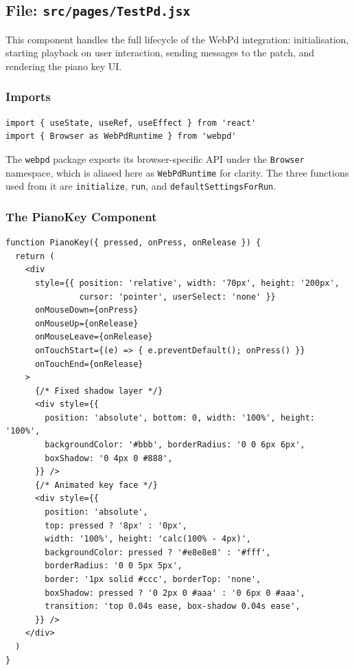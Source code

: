 \documentclass[12pt,a4paper]{article}
\begin{document}
\subsection{File: \texttt{src/pages/TestPd.jsx}}

This component handles the full lifecycle of the WebPd integration: initialisation, starting playback on user interaction, sending messages to the patch, and rendering the piano key UI.

\subsubsection{Imports}

\begin{lstlisting}[style=js, caption={Imports}]
import { useState, useRef, useEffect } from 'react'
import { Browser as WebPdRuntime } from 'webpd'
\end{lstlisting}

The \texttt{webpd} package exports its browser-specific API under the \texttt{Browser} namespace, which is aliased here as \texttt{WebPdRuntime} for clarity. The three functions used from it are \texttt{initialize}, \texttt{run}, and \texttt{defaultSettingsForRun}.

\subsubsection{The PianoKey Component}

\begin{lstlisting}[style=js, caption={PianoKey component}]
function PianoKey({ pressed, onPress, onRelease }) {
  return (
    <div
      style={{ position: 'relative', width: '70px', height: '200px',
               cursor: 'pointer', userSelect: 'none' }}
      onMouseDown={onPress}
      onMouseUp={onRelease}
      onMouseLeave={onRelease}
      onTouchStart={(e) => { e.preventDefault(); onPress() }}
      onTouchEnd={onRelease}
    >
      {/* Fixed shadow layer */}
      <div style={{
        position: 'absolute', bottom: 0, width: '100%', height: '100%',
        backgroundColor: '#bbb', borderRadius: '0 0 6px 6px',
        boxShadow: '0 4px 0 #888',
      }} />
      {/* Animated key face */}
      <div style={{
        position: 'absolute',
        top: pressed ? '8px' : '0px',
        width: '100%', height: 'calc(100% - 4px)',
        backgroundColor: pressed ? '#e8e8e8' : '#fff',
        borderRadius: '0 0 5px 5px',
        border: '1px solid #ccc', borderTop: 'none',
        boxShadow: pressed ? '0 2px 0 #aaa' : '0 6px 0 #aaa',
        transition: 'top 0.04s ease, box-shadow 0.04s ease',
      }} />
    </div>
  )
}
\end{lstlisting}
\end{document}

